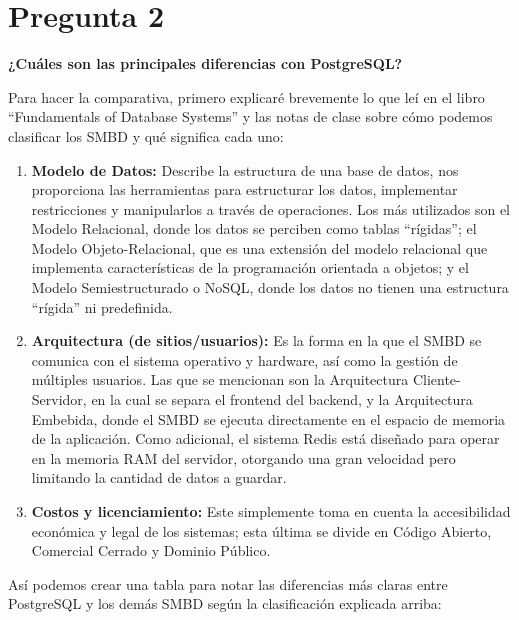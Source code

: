 
\section*{Pregunta 2} 
\textbf{¿Cuáles son las principales diferencias con PostgreSQL?}

Para hacer la comparativa, primero explicaré brevemente lo que leí en el libro ``Fundamentals of Database Systems'' \cite{FDS-Elmasri-Navathe} y las notas de clase \cite{01ConceptosBasicos} sobre cómo podemos clasificar los SMBD y qué significa cada uno:
\begin{enumerate}
    \item \textbf{Modelo de Datos:} Describe la estructura de una base de datos, nos proporciona las herramientas para estructurar los datos, implementar restricciones y manipularlos a través de operaciones. Los más utilizados son el Modelo Relacional, donde los datos se perciben como tablas ``rígidas''; el Modelo Objeto-Relacional, que es una extensión del modelo relacional que implementa características de la programación orientada a objetos; y el Modelo Semiestructurado o NoSQL, donde los datos no tienen una estructura ``rígida'' ni predefinida.
    
    \item \textbf{Arquitectura (de sitios/usuarios):} Es la forma en la que el SMBD se comunica con el sistema operativo y hardware, así como la gestión de múltiples usuarios. Las que se mencionan son la Arquitectura Cliente-Servidor, en la cual se separa el frontend del backend, y la Arquitectura Embebida, donde el SMBD se ejecuta directamente en el espacio de memoria de la aplicación. Como adicional, el sistema Redis está diseñado para operar en la memoria RAM del servidor, otorgando una gran velocidad pero limitando la cantidad de datos a guardar.

    \item \textbf{Costos y licenciamiento:} Este simplemente toma en cuenta la accesibilidad económica y legal de los sistemas; esta última se divide en Código Abierto, Comercial Cerrado y Dominio Público.
\end{enumerate}

Así podemos crear una tabla para notar las diferencias más claras entre PostgreSQL y los demás SMBD según la clasificación explicada arriba:

